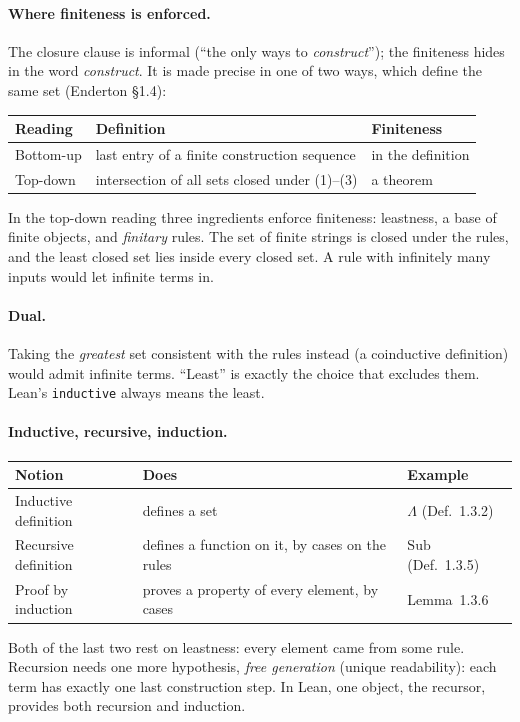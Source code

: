 \documentclass[11pt]{article}
\newcommand{\Lam}{\Lambda}
\begin{document}
\begin{remark}
\paragraph{Where finiteness is enforced.} The closure clause is informal
(``the only ways to \emph{construct}''); the finiteness hides in the word
\emph{construct}. It is made precise in one of two ways, which define the
same set (Enderton \S1.4):
\begin{center}
\begin{tabular}{lll}
\toprule
Reading & Definition & Finiteness \\
\midrule
Bottom-up & last entry of a finite construction sequence & in the definition \\
Top-down & intersection of all sets closed under (1)--(3) & a theorem \\
\bottomrule
\end{tabular}
\end{center}
In the top-down reading three ingredients enforce finiteness: leastness, a
base of finite objects, and \emph{finitary} rules. The set of finite strings
is closed under the rules, and the least closed set lies inside every closed
set. A rule with infinitely many inputs would let infinite terms in.

\paragraph{Dual.} Taking the \emph{greatest} set consistent with the rules
instead (a coinductive definition) would admit infinite terms. ``Least'' is
exactly the choice that excludes them. Lean's \texttt{inductive} always means
the least.

\paragraph{Inductive, recursive, induction.}
\begin{center}
\begin{tabular}{lll}
\toprule
Notion & Does & Example \\
\midrule
Inductive definition & defines a set & $\Lam$ (Def.~1.3.2) \\
Recursive definition & defines a function on it, by cases on the rules
  & $\mathrm{Sub}$ (Def.~1.3.5) \\
Proof by induction & proves a property of every element, by cases
  & Lemma~1.3.6 \\
\bottomrule
\end{tabular}
\end{center}
Both of the last two rest on leastness: every element came from some rule.
Recursion needs one more hypothesis, \emph{free generation} (unique
readability): each term has exactly one last construction step. In Lean, one
object, the recursor, provides both recursion and induction.
\end{remark}
\end{document}
